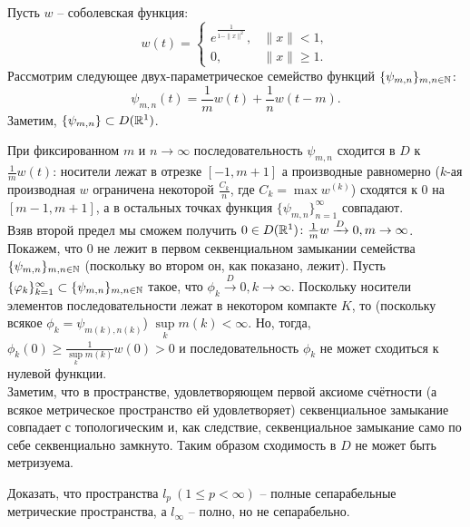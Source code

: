 \begin{solve}
    Пусть $w$ -- соболевская функция:
    \[
        w(t) = \begin{cases}
                   e^{\frac{1}{1 - \|x\|^2}}, & \|x\| < 1, \\
                   0, & \|x\| \geq 1.
        \end{cases}
    \]
    Рассмотрим следующее двух-параметрическое семейство функций $\{\psi_{m, n}\}_{m, n \in \mathbb{N}}\colon$
    \[
        \psi_{m, n}(t) = \frac{1}{m}w(t) + \frac{1}{n}w(t - m).
    \]
    Заметим, $\{\psi_{m, n}\} \subset D(\mathbb{R}^1)$.

    При фиксированном $m$ и $n \rightarrow \infty$ последовательность $\psi_{m, n}$ сходится в $D$ к $\frac{1}{m}w(t)$: носители лежат в отрезке $[-1, m + 1]$ а производные равномерно ($k$-ая производная $w$ ограничена некоторой $\frac{C_k}{n}$, где $C_k = \max w^{(k)}$) сходятся к 0 на $[m - 1, m + 1]$, а в остальных точках функция $\{\psi_{m, n}\}_{n = 1}^{\infty}$ совпадают. \\
    Взяв второй предел мы сможем получить $0 \in D(\mathbb{R}^1)\colon \frac{1}{m}w \xrightarrow{D} 0, m \rightarrow \infty$. \\
    Покажем, что 0 не лежит в первом секвенциальном замыкании семейства $\{\psi_{m, n}\}_{m, n \in \mathbb{N}}$ (поскольку во втором он, как показано, лежит). Пусть $\{\varphi_k\}_{k = 1}^{\infty} \subset \{\psi_{m, n}\}_{m, n \in \mathbb{N}}$ такое, что $\phi_{k} \xrightarrow{D} 0, k \rightarrow \infty$. Поскольку носители элементов последовательности лежат в некотором компакте $K$, то (поскольку всякое $\phi_k = \psi_{m(k), n(k)}$) $\sup\limits_{k}m(k) < \infty$. Но, тогда, $\phi_k(0) \geq \frac{1}{\sup\limits_k m(k)}w(0) > 0$ и последовательность $\phi_k$ не может сходиться к нулевой функции. \\
    Заметим, что в пространстве, удовлетворяющем первой аксиоме счётности (а всякое метрическое пространство ей удовлетворяет) секвенциальное замыкание совпадает с топологическим и, как следствие, секвенциальное замыкание само по себе секвенциально замкнуто. Таким образом сходимость в $D$ не может быть метризуема.
\end{solve}
\begin{task}[\S 2.2]
    Доказать, что пространства $l_p \  (1 \leq p < \infty)$ -- полные сепарабельные метрические пространства, а $l_\infty$ -- полно, но не сепарабельно.
\end{task}

